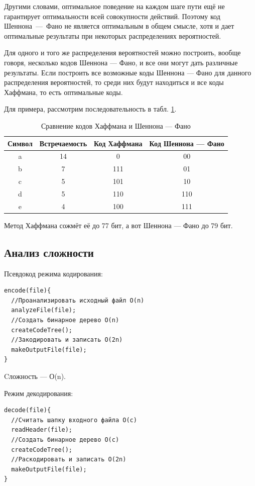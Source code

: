 \documentclass{article}
\begin{document}
Другими словами, 
оптимальное поведение на каждом шаге пути ещё не гарантирует оптимальности всей совокупности действий. 
Поэтому код Шеннона~---~Фано не является оптимальным в общем смысле, хотя и дает оптимальные 
результаты при некоторых распределениях вероятностей. 

Для одного и того же распределения вероятностей 
можно построить, вообще говоря, несколько кодов Шеннона --- Фано, и все они могут дать различные 
результаты. Если построить все возможные коды Шеннона --- Фано для данного распределения вероятностей, 
то среди них будут находиться и все коды Хаффмана, то есть оптимальные коды.\cite{comp}

Для примера, рассмотрим последовательность в табл. \ref{hafacomp}. 
\begin{table}
  \begin{center}
    \begin{tabular}{|c|c|c|c|}
      \hline
      Символ & Встречаемость & Код Хаффмана & Код Шеннона --- Фано \\
      \hline
      a & 14 & 0 & 00 \\
      \hline
      b & 7 & 111 & 01 \\
      \hline
      c & 5 & 101 & 10 \\
      \hline
      d & 5 & 110 & 110 \\
      \hline
      e & 4 & 100 & 111 \\
      \hline
    \end{tabular}
    \caption{Сравнение кодов Хаффмана и Шеннона --- Фано\label{hafacomp}}
  \end{center}
\end{table}
Метод Хаффмана сожмёт её до 77 бит, а вот Шеннона --- Фано до 79 бит.

\subsection{Анализ сложности}

Псевдокод режима кодирования:
\begin{lstlisting}
encode(file){
  //Проанализировать исходный файл O(n)
  analyzeFile(file);
  //Создать бинарное дерево O(n)
  createCodeTree();
  //Закодировать и записать О(2n)
  makeOutputFile(file);
}
\end{lstlisting}
 
Cложность --- О(n).

Режим декодирования:
\vspace{1em}
\begin{lstlisting}
decode(file){
  //Считать шапку входного файла O(с)
  readHeader(file);
  //Создать бинарное дерево O(c)
  createCodeTree();
  //Раскодировать и записать О(2n)
  makeOutputFile(file);
}

\end{lstlisting}
\end{document}
